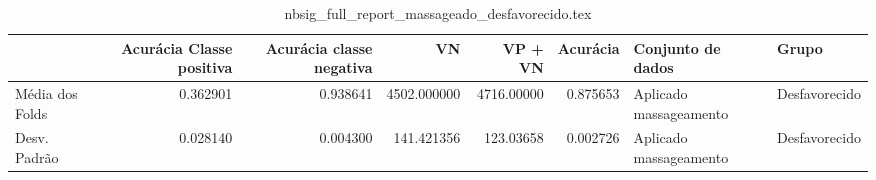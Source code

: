 \begin{table}
\centering
\caption{nbsig_full_report_massageado_desfavorecido.tex}
\label{nbsig_full_report_massageado_desfavorecido.tex}
\begin{tabular}{lrrrrrll}
\toprule
{}              &  Acurácia Classe positiva &  Acurácia classe negativa &          VN  &    VP + VN  &  Acurácia &       Conjunto de dados &          Grupo \\
\midrule
Média dos Folds &                  0.362901 &                  0.938641 &  4502.000000 &  4716.00000 &  0.875653 &  Aplicado massageamento &  Desfavorecido \\
Desv. Padrão    &                  0.028140 &                  0.004300 &   141.421356 &   123.03658 &  0.002726 &  Aplicado massageamento &  Desfavorecido \\
\bottomrule
\end{tabular}
\end{table}
